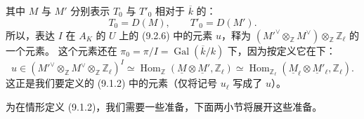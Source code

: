 其中 $M$ 与 $M'$ 分别表示 $T_0$ 与 $T'_0$ 相对于 $\overline k$ 的：
\begin{equation}\tag{9.2.8}
 T_0=D(M),\qquad T'_0=D(M').
\end{equation}
所以，表达 $I$ 在 $A_K$ 的  $U$ 上的 (9.2.6) 中的元素 $u$，释为 $(M'^\vee\otimes_{\mathbb Z}M^\vee)\otimes_{\mathbb Z}\mathbb Z_\ell$ 的一个元素。
这个元素还在 $\pi_0=\pi/I=\operatorname{Gal}(\overline k/k)$ 下，因为按定义它在下：
\begin{equation}\tag{9.2.9}
 u\in(M'^\vee\otimes_{\mathbb Z}M^\vee\otimes_{\mathbb Z}\mathbb Z_\ell)^I
 \simeq\operatorname{Hom}_{\mathbb Z}(\underline M\otimes\underline M',\mathbb Z_\ell)
 \simeq\operatorname{Hom}_{\mathbb Z_\ell}(\underline M_\ell\otimes\underline M'_\ell,\mathbb Z_\ell).
\end{equation}
这正是我们要定义的 (9.1.2) 中的元素（仅将记号 $u_\ell$ 写成了 $u$）。

为在情形定义 (9.1.2)，我们需要一些准备，下面两小节将展开这些准备。

